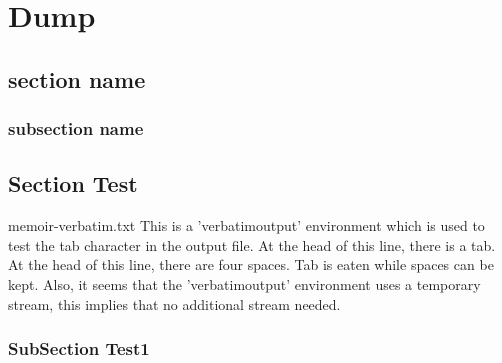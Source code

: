 \documentclass[10pt,a4paper,extrafontsizes]{memoir}
\begin{document}


\chapter{Dump} %
\label{chap:dump}

\section{section name} %
\label{sec:section_name}



\subsection{subsection name} %
\label{sub:subsection_name}


\section{Section Test}

\begin{verbatimoutput}{memoir-verbatim.txt}
This is a 'verbatimoutput' environment which is used to test the tab character in the output file.
	At the head of this line, there is a tab.
    At the head of this line, there are four spaces.
Tab is eaten while spaces can be kept.
Also, it seems that the 'verbatimoutput' environment uses a temporary stream, this implies that no additional stream needed.
\end{verbatimoutput}

\subsection{SubSection Test1}
\label{sub:subsec1}

\end{document}
